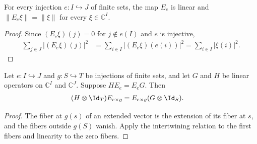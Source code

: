 \begin{lemma}
    \label{lem:physical_euclidean_extension_zero_isometry}
    \leanok
    For every injection $e:I\hookrightarrow J$ of finite sets, the map $E_e$
    is linear and $\lVert E_e\xi\rVert=\lVert\xi\rVert$ for every
    $\xi\in\mathbb C^I$.
\end{lemma}
\begin{proof}
    \leanok
    Since $(E_e\xi)(j)=0$ for $j\notin e(I)$ and $e$ is injective,
    \begin{align}
        \sum_{j\in J}\lvert(E_e\xi)(j)\rvert^2
         & =\sum_{i\in I}\lvert(E_e\xi)(e(i))\rvert^2
        =\sum_{i\in I}\lvert\xi(i)\rvert^2.
    \end{align}
\end{proof}

\begin{lemma}
    \label{lem:physical_spectator_embedding_transport}
    \leanok
    Let $e:I\hookrightarrow J$ and $g:S\hookrightarrow T$ be injections of
    finite sets, and let $G$ and $H$ be linear operators on
    $\mathbb C^I$ and $\mathbb C^J$. Suppose $HE_e=E_eG$. Then
    \begin{align}
        (H\otimes\Id_T)E_{e\times g} & =E_{e\times g}(G\otimes\Id_S).
    \end{align}
\end{lemma}
\begin{proof}
    \leanok
    The fiber at $g(s)$ of an extended vector is the extension of its fiber at
    $s$, and the fibers outside $g(S)$ vanish. Apply the intertwining relation
    to the first fibers and linearity to the zero fibers.
\end{proof}

